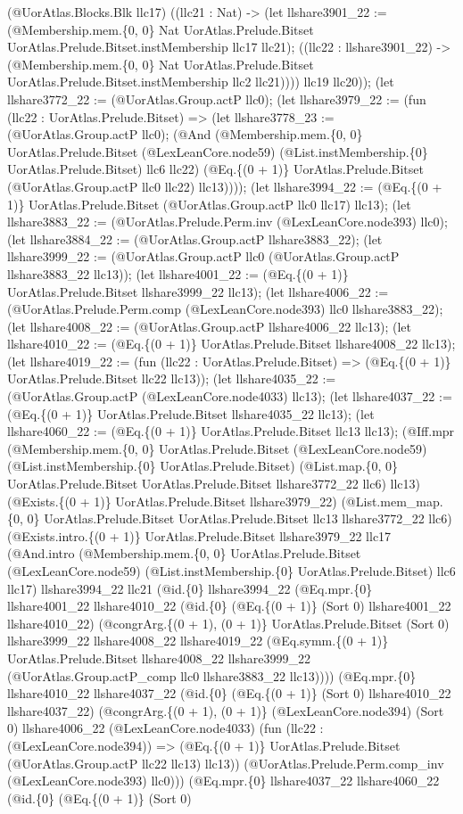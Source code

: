 \documentclass[11pt]{article}
\begin{document}
(@UorAtlas.Blocks.Blk llc17) ((llc21 : Nat) -> (let llshare3901\_22 := (@Membership.mem.\{0, 0\} Nat UorAtlas.Prelude.Bitset UorAtlas.Prelude.Bitset.instMembership llc17 llc21); ((llc22 : llshare3901\_22) -> (@Membership.mem.\{0, 0\} Nat UorAtlas.Prelude.Bitset UorAtlas.Prelude.Bitset.instMembership llc2 llc21)))) llc19 llc20)); (let llshare3772\_22 := (@UorAtlas.Group.actP llc0); (let llshare3979\_22 := (fun (llc22 : UorAtlas.Prelude.Bitset) => (let llshare3778\_23 := (@UorAtlas.Group.actP llc0); (@And (@Membership.mem.\{0, 0\} UorAtlas.Prelude.Bitset (@LexLeanCore.node59) (@List.instMembership.\{0\} UorAtlas.Prelude.Bitset) llc6 llc22) (@Eq.\{(0 + 1)\} UorAtlas.Prelude.Bitset (@UorAtlas.Group.actP llc0 llc22) llc13)))); (let llshare3994\_22 := (@Eq.\{(0 + 1)\} UorAtlas.Prelude.Bitset (@UorAtlas.Group.actP llc0 llc17) llc13); (let llshare3883\_22 := (@UorAtlas.Prelude.Perm.inv (@LexLeanCore.node393) llc0); (let llshare3884\_22 := (@UorAtlas.Group.actP llshare3883\_22); (let llshare3999\_22 := (@UorAtlas.Group.actP llc0 (@UorAtlas.Group.actP llshare3883\_22 llc13)); (let llshare4001\_22 := (@Eq.\{(0 + 1)\} UorAtlas.Prelude.Bitset llshare3999\_22 llc13); (let llshare4006\_22 := (@UorAtlas.Prelude.Perm.comp (@LexLeanCore.node393) llc0 llshare3883\_22); (let llshare4008\_22 := (@UorAtlas.Group.actP llshare4006\_22 llc13); (let llshare4010\_22 := (@Eq.\{(0 + 1)\} UorAtlas.Prelude.Bitset llshare4008\_22 llc13); (let llshare4019\_22 := (fun (llc22 : UorAtlas.Prelude.Bitset) => (@Eq.\{(0 + 1)\} UorAtlas.Prelude.Bitset llc22 llc13)); (let llshare4035\_22 := (@UorAtlas.Group.actP (@LexLeanCore.node4033) llc13); (let llshare4037\_22 := (@Eq.\{(0 + 1)\} UorAtlas.Prelude.Bitset llshare4035\_22 llc13); (let llshare4060\_22 := (@Eq.\{(0 + 1)\} UorAtlas.Prelude.Bitset llc13 llc13); (@Iff.mpr (@Membership.mem.\{0, 0\} UorAtlas.Prelude.Bitset (@LexLeanCore.node59) (@List.instMembership.\{0\} UorAtlas.Prelude.Bitset) (@List.map.\{0, 0\} UorAtlas.Prelude.Bitset UorAtlas.Prelude.Bitset llshare3772\_22 llc6) llc13) (@Exists.\{(0 + 1)\} UorAtlas.Prelude.Bitset llshare3979\_22) (@List.mem\_map.\{0, 0\} UorAtlas.Prelude.Bitset UorAtlas.Prelude.Bitset llc13 llshare3772\_22 llc6) (@Exists.intro.\{(0 + 1)\} UorAtlas.Prelude.Bitset llshare3979\_22 llc17 (@And.intro (@Membership.mem.\{0, 0\} UorAtlas.Prelude.Bitset (@LexLeanCore.node59) (@List.instMembership.\{0\} UorAtlas.Prelude.Bitset) llc6 llc17) llshare3994\_22 llc21 (@id.\{0\} llshare3994\_22 (@Eq.mpr.\{0\} llshare4001\_22 llshare4010\_22 (@id.\{0\} (@Eq.\{(0 + 1)\} (Sort 0) llshare4001\_22 llshare4010\_22) (@congrArg.\{(0 + 1), (0 + 1)\} UorAtlas.Prelude.Bitset (Sort 0) llshare3999\_22 llshare4008\_22 llshare4019\_22 (@Eq.symm.\{(0 + 1)\} UorAtlas.Prelude.Bitset llshare4008\_22 llshare3999\_22 (@UorAtlas.Group.actP\_comp llc0 llshare3883\_22 llc13)))) (@Eq.mpr.\{0\} llshare4010\_22 llshare4037\_22 (@id.\{0\} (@Eq.\{(0 + 1)\} (Sort 0) llshare4010\_22 llshare4037\_22) (@congrArg.\{(0 + 1), (0 + 1)\} (@LexLeanCore.node394) (Sort 0) llshare4006\_22 (@LexLeanCore.node4033) (fun (llc22 : (@LexLeanCore.node394)) => (@Eq.\{(0 + 1)\} UorAtlas.Prelude.Bitset (@UorAtlas.Group.actP llc22 llc13) llc13)) (@UorAtlas.Prelude.Perm.comp\_inv (@LexLeanCore.node393) llc0))) (@Eq.mpr.\{0\} llshare4037\_22 llshare4060\_22 (@id.\{0\} (@Eq.\{(0 + 1)\} (Sort 0) 
\end{document}
